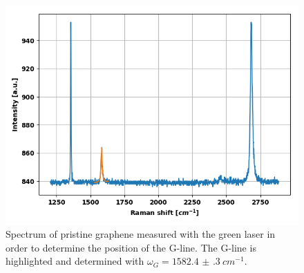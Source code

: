 \documentclass[12pt,a4paper]{article}
\begin{document}
\begin{figure}
\centering
\includegraphics[scale=0.5]{Bilder/part6/prestine_green.png}
\caption{Spectrum of pristine graphene measured with the green laser in order to determine the position of the G-line. The G-line is highlighted and determined with $\omega_{G} = \SI{1582.4(3)}{cm^{-1}}$.}
\label{fig:pristine_green}
\end{figure}
\end{document}
